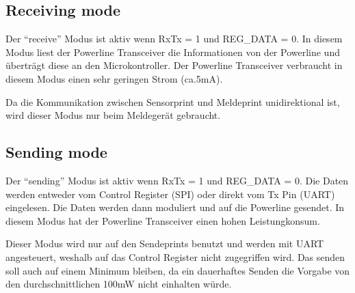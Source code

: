 \subsection{Receiving mode}
Der ``receive'' Modus ist aktiv wenn RxTx = 1 und REG_DATA = 0. In diesem Modus liest der Powerline Transceiver die Informationen von der Powerline und überträgt diese an den Microkontroller. Der Powerline Transceiver verbraucht in diesem Modus einen sehr geringen Strom (ca.5mA).

Da die Kommunikation zwischen Sensorprint und Meldeprint unidirektional ist, wird dieser Modus nur beim Meldegerät gebraucht.

\subsection{Sending mode}
Der ``sending'' Modus ist aktiv wenn RxTx = 1 und REG_DATA = 0. Die Daten werden entweder vom Control Register (SPI) oder direkt vom Tx Pin (UART) eingelesen. Die Daten werden dann moduliert und auf die Powerline gesendet. In diesem Modus hat der Powerline Transceiver einen hohen Leistungkonsum.

Dieser Modus wird nur auf den Sendeprints benutzt und werden mit UART angesteuert, weshalb auf das Control Register nicht zugegriffen wird. Das senden soll auch auf einem Minimum bleiben, da ein dauerhaftes Senden die Vorgabe von den durchschnittlichen 100mW nicht einhalten würde.



